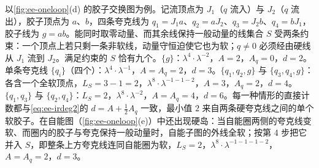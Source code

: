\begin{example}[两圈图的软子集]\label{ex:ee-soft-sets}
以\cref{fig:ee-oneloop}(d) 的胶子交换图为例。记流顶点为 $J_1$（$q$ 流入）与 $J_2$（$q$ 流出），胶子顶点为 $a$、$b$，四条夸克线为 $q_1=J_1a$、$q_2=aJ_2$、$q_3=J_2b$、$q_4=bJ_1$，胶子线为 $g=ab$。能同时取零动量、而其余线保持一般动量的线集合 $S$ 受两条约束：一个顶点上若只剩一条非软线，动量守恒迫使它也为软；$q\ne0$ 必须经由硬线从 $J_1$ 流到 $J_2$。满足约束的 $S$ 恰有九个。$\{g\}$：$\lambda^4\cdot\lambda^{-2}$，$A=2$，$A_q=0$，$d=2$。单条夸克线 $\{q_i\}$（四个）：$\lambda^4\cdot\lambda^{-1}$，$A=A_q=2$，$d=3$。$\{q_1,q_2,g\}$ 与 $\{q_3,q_4,g\}$：各含一个全软顶点，$L_S=3-1=2$，$\lambda^8\cdot\lambda^{-1-1-2}$，$A=3$，$A_q=2$，$d=4$。$\{q_1,q_3\}$ 与 $\{q_2,q_4\}$：$L_S=2$，$\lambda^8\cdot\lambda^{-2}$，$A=A_q=4$，$d=6$。每一种情形的直接计数都与\cref{eq:ee-irdeg2}的 $d=A+\frac12A_q$ 一致，最小值 $2$ 来自两条硬夸克线之间的单个软胶子。在自能图（\cref{fig:ee-oneloop}(e)）中还出现硬岛：当自能圈两侧的夸克线变软、而圈内的胶子与夸克保持一般动量时，自能子图的外线全软；按第 4 步把它并入 $S$，即整条上方夸克线连同自能圈为软，$L_S=2$，$\lambda^{8}\cdot\lambda^{-1-1-1-2}$，$A=A_q=2$，$d=3$。
\end{example}

